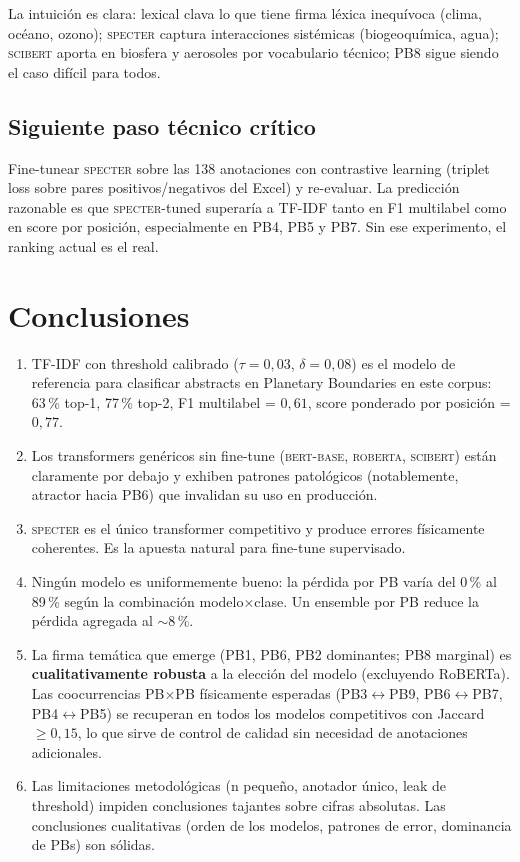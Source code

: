\documentclass[11pt,a4paper]{article}
\begin{document}
La intuición es clara: lexical clava lo que tiene firma léxica inequívoca (clima, océano, ozono); \textsc{specter} captura interacciones sistémicas (biogeoquímica, agua); \textsc{scibert} aporta en biosfera y aerosoles por vocabulario técnico; PB8 sigue siendo el caso difícil para todos.

\subsection{Siguiente paso técnico crítico}

Fine-tunear \textsc{specter} sobre las 138 anotaciones con contrastive learning (triplet loss sobre pares positivos/negativos del Excel) y re-evaluar. La predicción razonable es que \textsc{specter}-tuned superaría a TF-IDF tanto en F1 multilabel como en score por posición, especialmente en PB4, PB5 y PB7. Sin ese experimento, el ranking actual es el real.

\section{Conclusiones}

\begin{enumerate}
\item TF-IDF con threshold calibrado ($\tau=0{,}03$, $\delta=0{,}08$) es el modelo de referencia para clasificar abstracts en Planetary Boundaries en este corpus: 63\,\% top-1, 77\,\% top-2, F1 multilabel = $0{,}61$, score ponderado por posición = $0{,}77$.
\item Los transformers genéricos sin fine-tune (\textsc{bert-base}, \textsc{roberta}, \textsc{scibert}) están claramente por debajo y exhiben patrones patológicos (notablemente, atractor hacia PB6) que invalidan su uso en producción.
\item \textsc{specter} es el único transformer competitivo y produce errores físicamente coherentes. Es la apuesta natural para fine-tune supervisado.
\item Ningún modelo es uniformemente bueno: la pérdida por PB varía del 0\,\% al 89\,\% según la combinación modelo$\times$clase. Un ensemble por PB reduce la pérdida agregada al $\sim 8\,\%$.
\item La firma temática que emerge (PB1, PB6, PB2 dominantes; PB8 marginal) es \textbf{cualitativamente robusta} a la elección del modelo (excluyendo RoBERTa). Las coocurrencias PB$\times$PB físicamente esperadas (PB3$\leftrightarrow$PB9, PB6$\leftrightarrow$PB7, PB4$\leftrightarrow$PB5) se recuperan en todos los modelos competitivos con Jaccard $\geq 0{,}15$, lo que sirve de control de calidad sin necesidad de anotaciones adicionales.
\item Las limitaciones metodológicas (n pequeño, anotador único, leak de threshold) impiden conclusiones tajantes sobre cifras absolutas. Las conclusiones cualitativas (orden de los modelos, patrones de error, dominancia de PBs) son sólidas.
\end{enumerate}
\end{document}
